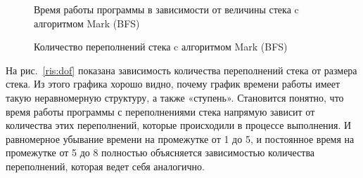    \begin{figure}
   \caption{Время работы программы в зависимости от величины стека c алгоритмом Mark (BFS)}
   \label{ris:btime}   
   \caption{Количество переполнений стека c алгоритмом Mark (BFS)}
   \label{ris:bof}
   \end{figure}
   

На рис.~\ref{ris:dof} показана зависимость количества переполнений стека от размера стека. Из этого графика хорошо видно, почему график времени работы имеет такую 
неравномерную структуру, а также «ступень». Становится понятно, что время работы программы с переполнениями стека напрямую зависит от количества этих переполнений,
которые происходили в процессе выполнения. И равномерное убывание времени на промежутке от 1 до 5, и постоянное время на промежутке от 5 до 8 полностью объясняется 
зависимостью количества переполнений, которая ведет себя аналогично.

